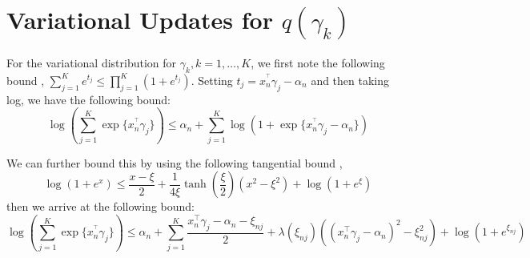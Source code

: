 \documentclass[twoside,11pt]{article}
\begin{document}

\section{Variational Updates for $q(\gamma_k)$} \label{app:gamma}  



For the variational distribution for $\gamma_k, k = 1, \ldots, K$, we first note the following bound \parencite{bouchard:07}, $\sum_{j = 1}^{K} e^{t_j} \leq \prod_{j = 1}^K (1 + e^{t_j})$. Setting $t_j = x_n^{^\intercal} \gamma_j - \alpha_{n}$ and then taking log, we have the following bound:
\begin{equation} \label{eq:log-sum-exp}
	\log \left( \sum_{j = 1}^K \exp\{ x_n^{^\intercal} \gamma_j \}\right) \leq \alpha_n + \sum_{j=1}^K \log \left( 1 + \exp \{ x_n^{^\intercal} \gamma_j - \alpha_n \}\right)
\end{equation}


We can further bound this by using the following tangential bound \parencite{jj:2001}, $$\log(1 + e^x) \leq \frac{x - \xi}{2} + \frac{1}{4\xi} \tanh \left( \frac{\xi}{2} \right) (x^2 - \xi^2) + \log\left(1 + e^{\xi}\right)$$ then we arrive at the following bound: 
\begin{equation} \label{eq:jj_bound}
	\log \left( \sum_{j = 1}^K \exp\{ x_n^{^\intercal} \gamma_j \}\right) \leq 
\alpha_n + \sum_{j = 1}^K \frac{x_n^{\intercal} \gamma_j - \alpha_n - \xi_{nj}}{2} + \lambda(\xi_{nj}) \left( (x_n^{\intercal} \gamma_j - \alpha_n)^2 - \xi_{nj}^2\right) + \log \left( 1 + e^{\xi_{nj}}\right)
\end{equation}
\end{document}
